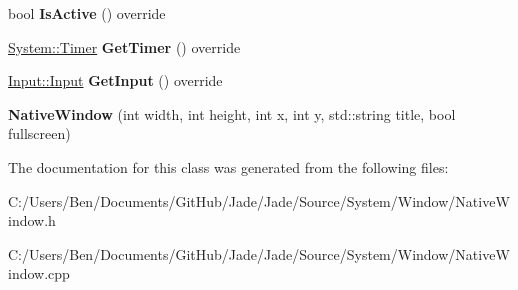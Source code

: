 \begin{DoxyCompactItemize}
\item 
\hypertarget{class_jade_1_1_system_1_1_native_window_a599df3a529a57565c3608af5d17a7aa0}{}bool {\bfseries Is\+Active} () override\label{class_jade_1_1_system_1_1_native_window_a599df3a529a57565c3608af5d17a7aa0}

\item 
\hypertarget{class_jade_1_1_system_1_1_native_window_aa759a2e68dfc0f39be2e508866fcdf28}{}\hyperlink{class_jade_1_1_system_1_1_timer}{System\+::\+Timer} {\bfseries Get\+Timer} () override\label{class_jade_1_1_system_1_1_native_window_aa759a2e68dfc0f39be2e508866fcdf28}

\item 
\hypertarget{class_jade_1_1_system_1_1_native_window_ac36d165a709f1fddce8c4408188b45d1}{}\hyperlink{struct_jade_1_1_input_1_1_input}{Input\+::\+Input} {\bfseries Get\+Input} () override\label{class_jade_1_1_system_1_1_native_window_ac36d165a709f1fddce8c4408188b45d1}

\item 
\hypertarget{class_jade_1_1_system_1_1_native_window_a5798bbff6f1d6dd8c0ada281b93de7a5}{}{\bfseries Native\+Window} (int width, int height, int x, int y, std\+::string title, bool fullscreen)\label{class_jade_1_1_system_1_1_native_window_a5798bbff6f1d6dd8c0ada281b93de7a5}

\end{DoxyCompactItemize}


The documentation for this class was generated from the following files\+:\begin{DoxyCompactItemize}
\item 
C\+:/\+Users/\+Ben/\+Documents/\+Git\+Hub/\+Jade/\+Jade/\+Source/\+System/\+Window/Native\+Window.\+h\item 
C\+:/\+Users/\+Ben/\+Documents/\+Git\+Hub/\+Jade/\+Jade/\+Source/\+System/\+Window/Native\+Window.\+cpp\end{DoxyCompactItemize}
